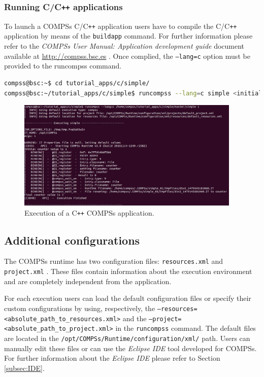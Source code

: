 \subsubsection{Running C/C\texttt{++} applications}
To launch a COMPSs C/C\texttt{++} application users have to compile the C/C\texttt{++} application by means of the \texttt{buildapp} command. For 
further information please refer to the \textit{COMPSs User Manual: Application development guide} document available at
\url{http://compss.bsc.es} . Once complied, the \texttt{--lang=c} option must be provided to the runcompss command.

\begin{lstlisting}[language=bash]
compss@bsc:~$ cd tutorial_apps/c/simple/
compss@bsc:~/tutorial_apps/c/simple$ runcompss --lang=c simple <initial_number>
\end{lstlisting}

\begin{figure}[h!]
  \centering
    \includegraphics[width=0.95\textwidth]{./Sections/2_Execution/Figures/c_execution.jpeg}
    \caption{Execution of a C\texttt{++} COMPSs application.}
    \label{fig:c_execution}
\end{figure}
\vspace{-0.4cm}

\newpage

\subsection{Additional configurations}

The COMPSs runtime has two configuration files: \texttt{resources.xml} and \texttt{project.xml} . 
These files contain information about the execution environment and are completely independent from the application.

For each execution users can load the default configuration files or specify their custom configurations 
by using, respectively, the \texttt{--resources=<absolute\_path\_to\_resources.xml>} and the
\texttt{--project=<absolute\_path\_to\_project.xml>} in the \texttt{runcompss} command. The default files are located 
in the \texttt{/opt/COMPSs/Runtime/configuration/xml/} path. 
Users can manually edit these files or can use the \textit{Eclipse IDE} tool developed for COMPSs. For further 
information about the \textit{Eclipse IDE} please refer to Section \ref{subsec:IDE}. 


